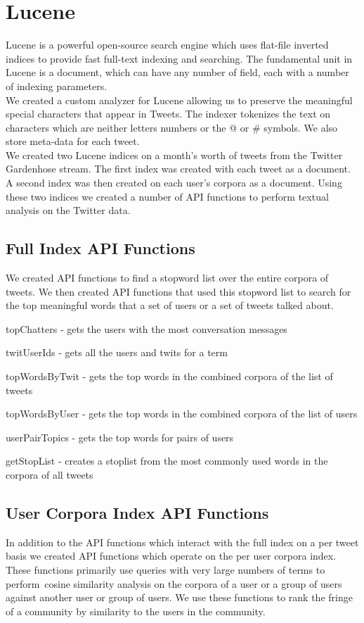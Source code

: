 \section{Lucene}
Lucene is a powerful open-source search engine which uses flat-file inverted indices to provide fast full-text indexing and searching.  The fundamental unit in Lucene is a document, which can have any number of field, each with a number of indexing parameters.\\
We created a custom analyzer for Lucene allowing us to preserve the meaningful special characters that appear in Tweets.  The indexer tokenizes the text on characters which are neither letters numbers or the @ or \# symbols.  We also store meta-data for each tweet.\\
We created two Lucene indices on a month's worth of tweets from the Twitter Gardenhose stream.  The first index was created with each tweet as a document.  A second index was then created on each user's corpora as a document.  Using these two indices we created a number of API functions to perform textual analysis on the Twitter data.\\
\subsection{Full Index API Functions}
We created API functions to find a stopword list over the entire corpora of tweets.  We then created API functions that used this stopword list to search for the top meaningful words that a set of users or a set of tweets talked about.
\begin{list}{.}
{
\setlength{\rightmargin}{\leftmargin}}
\item topChatters - gets the users with the most conversation messages
\item twitUserIds - gets all the users and twits for a term
\item topWordsByTwit - gets the top words in the combined corpora of the list of tweets
\item topWordsByUser - gets the top words in the combined corpora of the list of users
\item userPairTopics - gets the top words for pairs of users
\item getStopList - creates a stoplist from the most commonly used words in the corpora of all tweets
\subsection{User Corpora Index API Functions}
In addition to the API functions which interact with the full index on a per tweet basis we created API functions which operate on the per user corpora index.  These functions primarily use queries with very large numbers of terms to perform cosine similarity analysis on the corpora of a user or a group of users against another user or group of users.  We use these functions to rank the fringe of a community by similarity to the users in the community.
\end{list}
